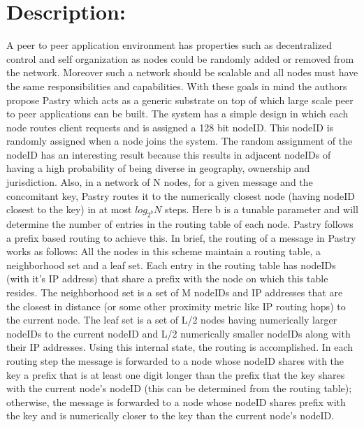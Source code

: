 \documentclass[12pt]{article}
\begin{document}
\section{Description:}
A peer to peer application environment has properties such as decentralized control and self organization as nodes could be randomly added or removed from the network. Moreover such a network should be scalable and all nodes must have the same responsibilities and capabilities.
\newline
With these goals in mind the authors propose Pastry which acts as a generic substrate on top of which large scale peer to peer applications can be built.
\newline \newline
The system has a simple design in which each node routes client requests and is assigned a 128 bit nodeID. This nodeID is randomly assigned when a node joins the system. The random assignment of the nodeID has an interesting result because this results in adjacent nodeIDs of having a high probability of being diverse in geography, ownership and jurisdiction.
\newline
Also, in a network of N nodes, for a given message and the concomitant key, Pastry routes it to the numerically closest node (having nodeID closest to the key) in at most $log_{2^b}N$ steps. Here b is a tunable parameter and will determine the number of entries in the routing table of each node.
Pastry follows a prefix based routing to  achieve this.
\newline \newline
In brief, the routing of a message in Pastry works as follows:
All the nodes in this scheme maintain a routing table, a neighborhood set and a leaf set. Each entry in the routing table has nodeIDs (with it's IP address) that share a prefix with the node on which this table resides.
\newline
The neighborhood set is a set of M nodeIDs and IP addresses that are the closest in distance (or some other proximity metric like IP routing hops) to the current node.
\newline
The leaf set is a set of L/2 nodes having numerically larger nodeIDs to the current nodeID and L/2 numerically smaller nodeIDs along with their IP addresses.
\newline
Using this internal state, the routing is accomplished.
\newline
In each routing step the message is forwarded to a node whose nodeID shares with the key a prefix that is at least one digit longer than the prefix that the key shares with the current node's nodeID (this can be determined from the routing table); otherwise, the message is forwarded to a node whose nodeID shares prefix with the key and is numerically closer to the key than the current node's nodeID.
\end{document}
